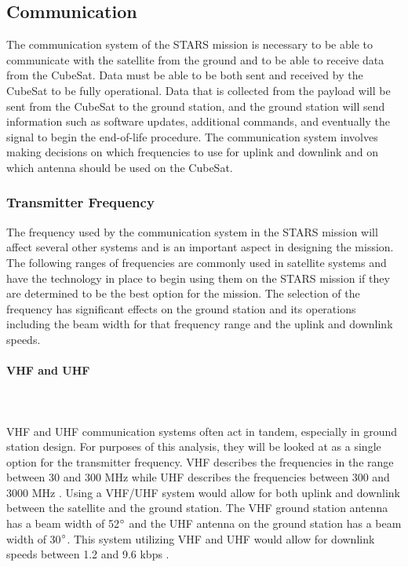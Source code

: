
\subsection{Communication}
The communication system of the STARS mission is necessary to be able to communicate with the satellite from the ground and to be able to receive data from the CubeSat. Data must be able to be both sent and received by the CubeSat to be fully operational. Data that is collected from the payload will be sent from the CubeSat to the ground station, and the ground station will send information such as software updates, additional commands, and eventually the signal to begin the end-of-life procedure. The communication system involves making decisions on which frequencies to use for uplink and downlink and on which antenna should be used on the CubeSat. 

\subsubsection{Transmitter Frequency}
The frequency used by the communication system in the STARS mission will affect several other systems and is an important aspect in designing the mission. The following ranges of frequencies are commonly used in satellite systems and have the technology in place to begin using them on the STARS mission if they are determined to be the best option for the mission. The selection of the frequency has significant effects on the ground station and its operations including the beam width for that frequency range and the uplink and downlink speeds. 

\paragraph{VHF and UHF} ~\\~\\
VHF and UHF communication systems often act in tandem, especially in ground station design. For purposes of this analysis, they will be looked at as a single option for the transmitter frequency. VHF describes the frequencies in the range between 30 and 300 MHz while UHF describes the frequencies between 300 and 3000 MHz \cite{ITU}. Using a VHF/UHF system would allow for both uplink and downlink between the satellite and the ground station. The VHF ground station antenna has a beam width of 52$\degree$ and the UHF antenna on the ground station has a beam width of 30$\degree$. This system utilizing VHF and UHF would allow for downlink speeds between 1.2 and 9.6 kbps \cite{isis_ground}.

